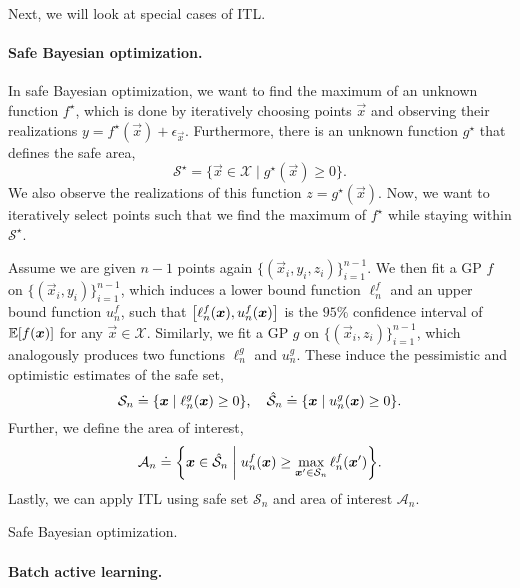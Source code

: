 Next, we will look at special cases of ITL.

\paragraph{Safe Bayesian optimization.}

In safe Bayesian optimization, we want to find the maximum of an unknown function $f^\star$, which
is done by iteratively choosing points $\vec{x}$ and observing their realizations $y =
    f^\star(\vec{x}) + \epsilon_{\vec{x}}$. Furthermore, there is an unknown function $g^\star$ that
defines the safe area, \[
    \mathcal{S}^\star = \{ \vec{x} \in \mathcal{X} \mid g^\star(\vec{x}) \geq 0 \}.
\]
We also observe the realizations of this function $z = g^\star(\vec{x})$. Now, we want to
iteratively select points such that we find the maximum of $f^\star$ while staying within
$\mathcal{S}^\star$.

Assume we are given $n-1$ points again $\{ (\vec{x}_i, y_i, z_i) \}_{i=1}^{n-1}$. We then fit a GP
$f$ on $\{ (\vec{x}_i, y_i) \}_{i=1}^{n-1}$, which induces a lower bound function $\ell_n^f$ and an
upper bound function $u_n^f$, such that $\lft[\ell_n^f(\vec{x}), u_n^f(\vec{x})\rgt]$ is the $95\%$
confidence interval of $\mathbb{E}[f(\bm{x})]$ for any $\vec{x} \in \mathcal{X}$. Similarly, we fit a GP
$g$ on $\{ (\vec{x}_i, z_i) \}_{i=1}^{n-1}$, which analogously produces two functions $\ell_n^g$
and $u_n^g$. These induce the pessimistic and optimistic estimates of the safe set, \[
    \mathcal{S}_n \doteq \lft\{ \vec{x} \;\middle|\; \ell_n^g(\vec{x}) \geq 0 \rgt\}, \quad \hat{\mathcal{S}}_n \doteq \lft\{ \vec{x} \;\middle|\; u_n^g(\vec{x}) \geq 0 \rgt\}.
\]
Further, we define the area of interest, \[
    \mathcal{A}_n \doteq \lft\{ \vec{x} \in \hat{\mathcal{S}}_n \;\middle|\; u_n^f(\vec{x}) \geq \max_{\vec{x}' \in \mathcal{S}_n} \ell_n^f(\vec{x}') \rgt\}.
\]
Lastly, we can apply ITL using safe set $\mathcal{S}_n$ and area of interest $\mathcal{A}_n$.

\begin{marginfigure}
    \centering
    \caption{Safe Bayesian optimization.}
    \label{fig:safe-bayesian-optimization}
\end{marginfigure}

\paragraph{Batch active learning.}

